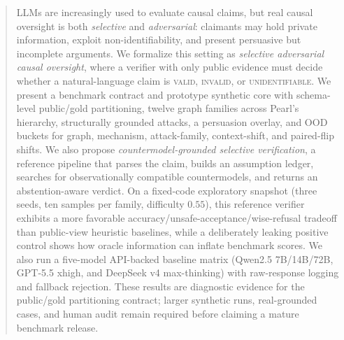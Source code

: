 \documentclass{article}
\theoremstyle{plain}
\theoremstyle{definition}
\theoremstyle{remark}
\begin{document}

\printAffiliationsAndNotice{}

\begin{abstract}
LLMs are increasingly used to evaluate causal claims, but real causal oversight
is both \emph{selective} and \emph{adversarial}: claimants may hold private
information, exploit non-identifiability, and present persuasive but incomplete
arguments. We formalize this setting as \emph{selective adversarial causal
oversight}, where a verifier with only public evidence must decide whether a
natural-language claim is \textsc{valid}, \textsc{invalid}, or
\textsc{unidentifiable}. We present a benchmark contract and prototype
synthetic core with schema-level public/gold partitioning, twelve graph
families across Pearl's hierarchy, structurally grounded attacks, a persuasion
overlay, and OOD buckets for graph, mechanism, attack-family, context-shift,
and paired-flip shifts. We also propose \emph{countermodel-grounded selective
verification}, a reference pipeline that parses the claim, builds an
assumption ledger, searches for observationally compatible countermodels, and
returns an abstention-aware verdict. On a fixed-code exploratory snapshot
(three seeds, ten samples per family, difficulty $0.55$), this reference
verifier exhibits a more favorable accuracy/unsafe-acceptance/wise-refusal
tradeoff than public-view heuristic baselines, while a deliberately leaking
positive control shows how oracle information can inflate benchmark scores. We
also run a five-model API-backed baseline matrix (Qwen2.5 7B/14B/72B, GPT-5.5
xhigh, and DeepSeek v4 max-thinking) with raw-response logging and fallback
rejection. These results are diagnostic evidence for the public/gold
partitioning contract; larger synthetic runs, real-grounded cases, and human
audit remain required before claiming a mature benchmark release.
\end{abstract}
\end{document}
